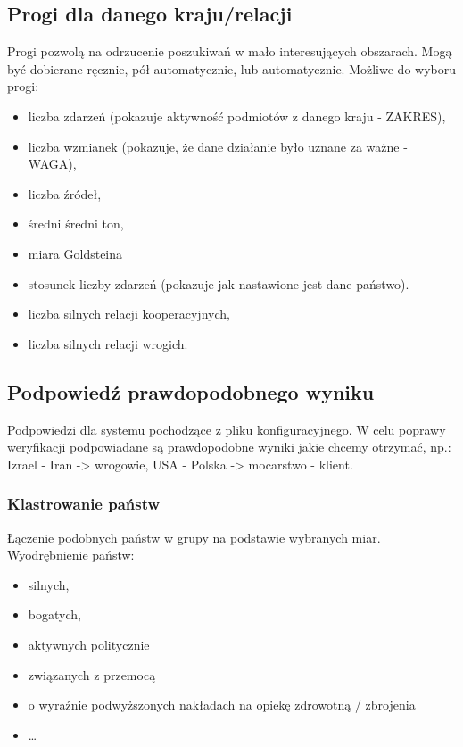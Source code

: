 \documentclass[11pt]{report}
\begin{document}
    \subsection{Progi dla danego kraju/relacji}\label{subsec:progi-dla-danego-kraju/relacji}
    Progi pozwolą na odrzucenie poszukiwań w mało interesujących obszarach.
    Mogą być dobierane ręcznie, pół-automatycznie, lub automatycznie.
    Możliwe do wyboru progi:
    \begin{itemize}
        \item liczba zdarzeń (pokazuje aktywność podmiotów z danego kraju - ZAKRES),
        \item liczba wzmianek (pokazuje, że dane działanie było uznane za ważne - WAGA),
        \item liczba źródeł,
        \item średni średni ton,
        \item miara Goldsteina
        \item stosunek liczby zdarzeń (pokazuje jak nastawione jest dane państwo).
        \item liczba silnych relacji kooperacyjnych,
        \item liczba silnych relacji wrogich.
    \end{itemize}

    \subsection{Podpowiedź prawdopodobnego wyniku}\label{subsec:podpowiedź-prawdopodobnego-wyniku}
    Podpowiedzi dla systemu pochodzące z pliku konfiguracyjnego.
    W celu poprawy weryfikacji podpowiadane są prawdopodobne wyniki jakie chcemy otrzymać,
    np.: Izrael - Iran -> wrogowie, USA - Polska -> mocarstwo - klient.

    \subsubsection{Klastrowanie państw}
    Łączenie podobnych państw w grupy na podstawie wybranych miar.
    Wyodrębnienie państw:
    \begin{itemize}
        \item silnych,
        \item bogatych,
        \item aktywnych politycznie
        \item związanych z przemocą
        \item o wyraźnie podwyższonych nakładach na opiekę zdrowotną / zbrojenia
        \item \ldots
    \end{itemize}
\end{document}
